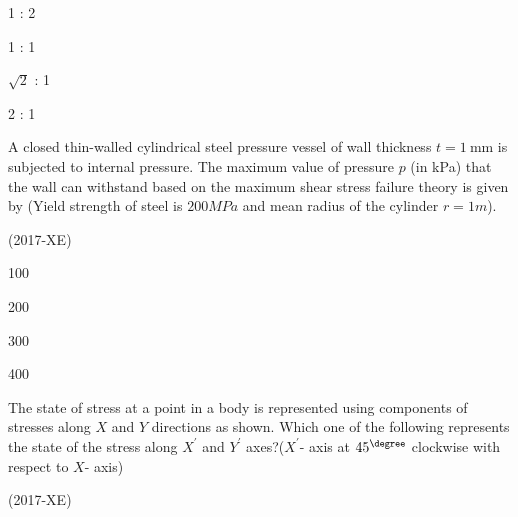 \begin{enumerate}
    \begin{multicols}{4}
        \item 1 : 2
        \item 1 : 1
        \item $\sqrt{2}$ : 1
        \item 2 : 1 
    \end{multicols}
\end{enumerate}
\item A closed thin-walled cylindrical steel pressure vessel of wall thickness $t = 1 \ \text{mm}$ is subjected to internal pressure. The maximum value of pressure $p$ (in kPa) that the wall can withstand based on the maximum shear stress failure theory is given by (Yield strength of steel is $200  MPa$ and mean radius of the cylinder $r = 1 m$).

\hfill(2017-XE)
\begin{enumerate}
    \begin{multicols}{4}
        \item 100
        \item 200
        \item 300
        \item 400
    \end{multicols}
\end{enumerate}
\item The state of stress at a point in a body is represented using components of stresses along $X$ and $Y$ directions as shown. Which one of the following represents the state of the stress along $X^\prime$ and $Y^\prime$ axes?($X^\prime$- axis at $45^{\degree}$ clockwise with respect to $X$- axis)

\hfill(2017-XE)
\begin{figure}[H]
\centering
{}%

\label{fig:my_label}
\end{figure}

